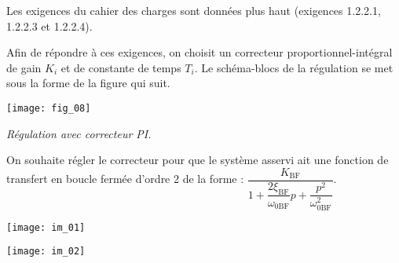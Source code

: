 \begin{multicols}{2}
Les exigences du cahier des charges sont données plus haut (exigences 1.2.2.1, 1.2.2.3 et 1.2.2.4).

Afin de répondre à ces exigences, on choisit un correcteur proportionnel-intégral de gain $K_i$ et de constante de temps $T_i$. Le schéma-blocs de la régulation se met sous la forme de la figure qui suit.

\begin{center}
\texttt{[image: fig\_08]}

\textit{Régulation avec correcteur PI.}
\end{center}


\ifprof
\begin{corrige}
\end{corrige}
\else
\fi

\vspace{.25cm}

On souhaite régler le correcteur pour que le système asservi ait une fonction de transfert en boucle fermée
d’ordre 2 de la forme :
$\dfrac{K_{\text{BF}}}{1+\dfrac{2\xi_{\text{BF}}}{\omega_{0\text{BF}}}p+\dfrac{p^2}{\omega_{0\text{BF}}^2}}$.


\ifprof
\begin{corrige}
\end{corrige}
\else
\fi




\begin{center}
\texttt{[image: im\_01]}
\end{center}

\begin{center}
\texttt{[image: im\_02]}
\end{center}
%
%
%

%


\end{multicols}
